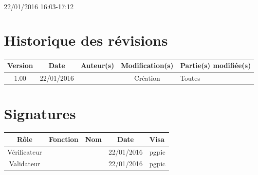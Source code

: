 \documentclass [a4paper] {article}
\begin{document}
22/01/2016			 				%
\hfill   
\hfill 	 16:03-17:12 				%



\section*{Historique des révisions}
\begin{center}
			\begin{tabular}{| c | c | c | c | p{4cm} |}
				\hline
				\rowcolor{Gray}
				Version & Date & Auteur(s) & Modification(s) & Partie(s) modifiée(s)		 \\
				\hline
				1.00 & 22/01/2016 & \Pierre & Création & Toutes \\
		\hline		
			\end{tabular}
		\end{center}

\section*{Signatures}

		\begin{center}
			\begin{tabular}{| c | c | c | c | p{4cm} |}
				\hline
				\rowcolor{Gray}
				Rôle & Fonction & Nom & Date & Visa		 \\
				\hline
				Vérificateur & \RQA & \Kafui & 22/01/2016 & pgpic \\[30pt]
				\hline
				Validateur & \CP & \Sergi & 22/01/2016 & pgpic \\[30pt]	
				\hline
			\end{tabular}
		\end{center}
		
\newpage		

\end{document}
